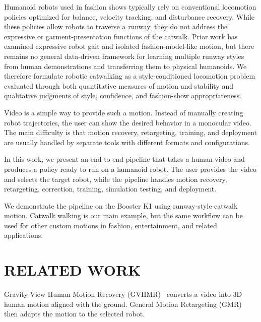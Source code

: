 \documentclass[letterpaper, 10 pt, conference]{ieeeconf}  %
\begin{document}
Humanoid robots used in fashion shows typically rely on conventional locomotion policies optimized for balance, velocity tracking, and disturbance recovery. While these policies allow robots to traverse a runway, they do not address the expressive or garment-presentation functions of the catwalk. Prior work has examined expressive robot gait and isolated fashion-model-like motion, but there remains no general data-driven framework for learning multiple runway styles from human demonstrations and transferring them to physical humanoids. We therefore formulate robotic catwalking as a style-conditioned locomotion problem evaluated through both quantitative measures of motion and stability and qualitative judgments of style, confidence, and fashion-show appropriateness.


Video is a simple way to provide such a motion. Instead of manually creating robot trajectories, the user can show the desired behavior in a monocular video. The main difficulty is that motion recovery, retargeting, training, and deployment are usually handled by separate tools with different formats and configurations.

In this work, we present an end-to-end pipeline that takes a human video and produces a policy ready to run on a humanoid robot. The user provides the video and selects the target robot, while the pipeline handles motion recovery, retargeting, correction, training, simulation testing, and deployment.

We demonstrate the pipeline on the Booster K1 using runway-style catwalk motion. Catwalk walking is our main example, but the same workflow can be used for other custom motions in fashion, entertainment, and related applications.



\section{RELATED WORK}

Gravity-View Human Motion Recovery (GVHMR)~\cite{gvhmr} converts a video into 3D human motion aligned with the ground. General Motion Retargeting (GMR)~\cite{gmr} then adapts the motion to the selected robot.
\end{document}
